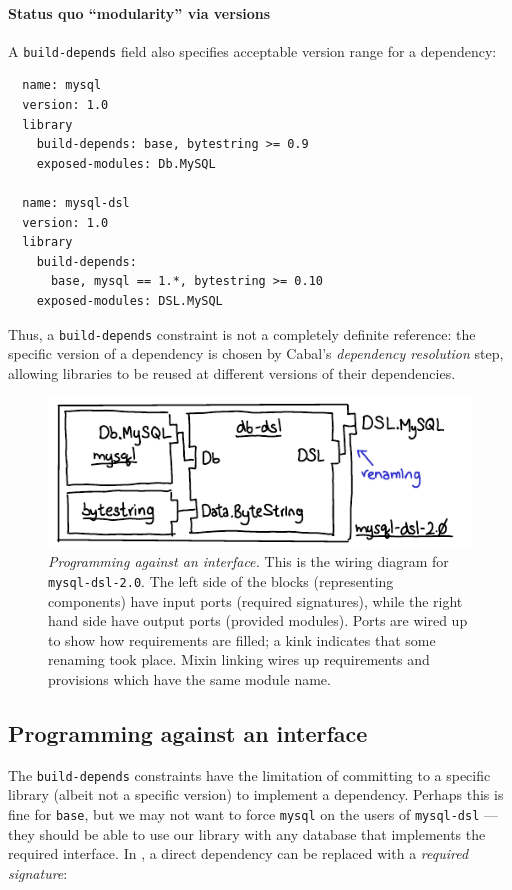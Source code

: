 \paragraph{Status quo ``modularity'' via versions}
A \verb|build-depends| field also specifies acceptable
version range for a dependency:

\begin{verbatim}
  name: mysql
  version: 1.0
  library
    build-depends: base, bytestring >= 0.9
    exposed-modules: Db.MySQL

  name: mysql-dsl
  version: 1.0
  library
    build-depends:
      base, mysql == 1.*, bytestring >= 0.10
    exposed-modules: DSL.MySQL
\end{verbatim}
Thus, a \verb|build-depends| constraint is not a completely definite
reference: the specific version of a dependency is chosen by Cabal's
\emph{dependency resolution} step, allowing libraries to be reused at different
versions of their dependencies.

\begin{figure}
\includegraphics{diagrams/programming-against-interface.pdf}
\caption{\emph{Programming against an interface.} This is the wiring
diagram for \texttt{mysql-dsl-2.0}.  The left side of the blocks
(representing components) have input ports (required signatures),
while the right hand side have output ports (provided modules).  Ports are wired up to show how
requirements are filled; a kink indicates that some renaming took place.
Mixin linking wires up requirements and provisions which have the same
module name.}
\label{fig:programming-against-interface}
\end{figure}

\subsection{Programming against an interface}

The \verb|build-depends|
constraints have the limitation of committing to a specific
library (albeit not a specific version) to implement a dependency.  Perhaps this is fine for
\verb|base|, but we may not want to force \verb|mysql| on the users of \verb|mysql-dsl|
---they should be able to use our library with any database that
implements the required interface.
In \Backpack{}, a direct dependency can be replaced with a
\emph{required signature}:

